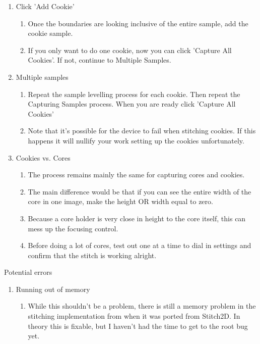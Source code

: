 \documentclass{article}
\begin{document}
\begin{outline}[enumerate]
\begin{enumerate}
\begin{enumerate}
    \end{enumerate}
    \item Click 'Add Cookie'
        \begin{enumerate}
            \item Once the boundaries are looking inclusive of the entire sample, add the cookie sample.
            \item If you only want to do one cookie, now you can click 'Capture All Cookies'. If not, continue to Multiple Samples.
        \end{enumerate}
    \item Multiple samples
		\begin{enumerate}
		\item Repeat the sample levelling process for each cookie. Then repeat the Capturing Samples process. When you are ready click 'Capture All Cookies'
        \item Note that it's possible for the device to fail when stitching cookies. If this happens it will nullify your work setting up the cookies unfortunately. 
        \end{enumerate}
    \item Cookies vs. Cores
        \begin{enumerate}
            \item The process remains mainly the same for capturing cores and cookies.
            \item The main difference would be that if you can see the entire width of the core in one image, make the height OR width equal to zero.
            \item Because a core holder is very close in height to the core itself, this can mess up the focusing control. 
            \item Before doing a lot of cores, test out one at a time to dial in settings and confirm that the stitch is working alright.
        \end{enumerate}
	\end{enumerate}
\item Potential errors
    \begin{enumerate}
    \item Running out of memory
        \begin{enumerate}
        \item While this shouldn't be a problem, there is still a memory problem in the stitching implementation from when it was ported from Stitch2D. In theory this is fixable, but I haven't had the time to get to the root bug yet.

\end{enumerate}
\end{enumerate}
\end{outline}
\end{document}
